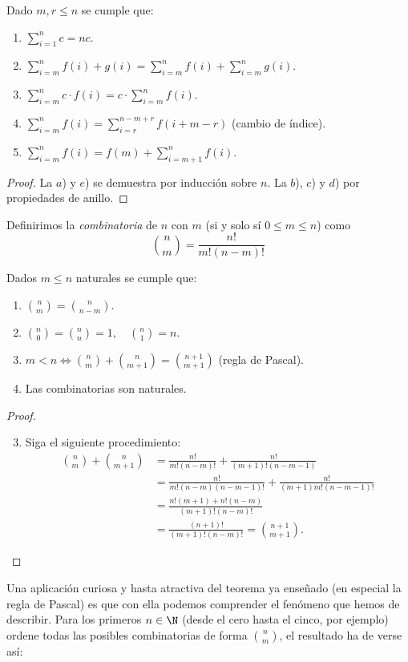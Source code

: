 \documentclass[11pt,oneside,a4paper]{book}
\begin{document}
\begin{thm}
Dado $m,r\leq n$ se cumple que:
\begin{enumerate}[$a$)]
\item $\sum_{i=1}^n c=nc$.
\item $\sum_{i=m}^n f(i)+g(i)=\sum_{i=m}^nf(i)+\sum_{i=m}^ng(i)$.
\item $\sum_{i=m}^n c\cdot f(i)=c\cdot\sum_{i=m}^n f(i)$.
\item $\sum_{i=m}^n f(i)=\sum_{i=r}^{n-m+r} f(i+m-r)$ (cambio de índice).
\item $\sum_{i=m}^n f(i)=f(m)+\sum_{i=m+1}^{n} f(i)$.
\end{enumerate}
\end{thm}
\begin{proof}
La $a$) y $e$) se demuestra por inducción sobre $n$. La $b$), $c$) y $d$) por propiedades de anillo.
\end{proof}
Definirimos la \textit{combinatoria} de $n$ con $m$ (si y solo sí $0\leq m\leq n$) como
$$
\binom{n}{m}=\frac{n!}{m!(n-m)!}
$$
\begin{thm}
Dados $m\leq n$ naturales se cumple que:
\begin{enumerate}[$a$)]
\item $\binom{n}{m}=\binom{n}{n-m}$.
\item $\binom{n}{0}=\binom{n}{n}=1,\quad\binom{n}{1}=n$.
\item $m\lt n\iff\binom{n}{m}+\binom{n}{m+1}=\binom{n+1}{m+1}$ (regla de Pascal).
\item Las combinatorias son naturales.
\end{enumerate}
\end{thm}
\begin{proof}
\begin{enumerate}[$a$)]
\setcounter{enumi}{2}
\item Siga el siguiente procedimiento:
\begin{align*}
\binom{n}{m}+\binom{n}{m+1}&=\frac{n!}{m!(n-m)!}+\frac{n!}{(m+1)!(n-m-1)}\\
&=\frac{n!}{m!(n-m)(n-m-1)!}+\frac{n!}{(m+1)m!(n-m-1)!}\\
&=\frac{n!(m+1)+n!(n-m)}{(m+1)!(n-m)!}\\
&=\frac{(n+1)!}{(m+1)!(n-m)!}=\binom{n+1}{m+1}.
\end{align*}
\end{enumerate}
\end{proof}
Una aplicación curiosa y hasta atractiva del teorema ya enseñado (en especial la regla de Pascal) es que con ella podemos comprender el fenómeno que hemos de describir. Para los primeros $n\in\N$ (desde el cero hasta el cinco, por ejemplo) ordene todas las posibles combinatorias de forma $\binom{n}{m}$, el resultado ha de verse así:
\end{document}
